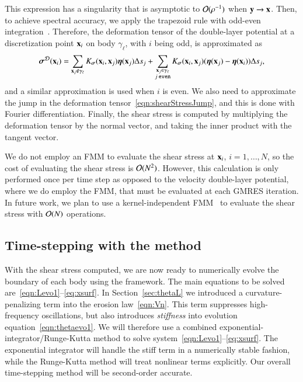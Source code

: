 \documentclass[preprint, 10pt]{elsarticle}
\begin{document}
This expression has a singularity that is asymptotic to
${\mathcal{O}}(\rho^{-1})$ when ${\mathbf{y}} \rightarrow {\mathbf{x}}$.  Then, to achieve
spectral accuracy, we apply the trapezoid rule with odd-even
integration~\cite{sid-isr1988}.  Therefore, the deformation tensor of
the double-layer potential at a discretization point ${\mathbf{x}}_i$ on body
$\gamma_\ell$, with $i$ being odd, is approximated as
\begin{align}
  {\boldsymbol\sigma}^{{\mathcal{D}}}({\mathbf{x}}_i) = \sum_{{\mathbf{x}}_j \notin \gamma_\ell}
    K_{\boldsymbol\sigma}({\mathbf{x}}_i,{\mathbf{x}}_j) {\boldsymbol\eta}({\mathbf{x}}_j) \Delta s_j + 
  \sum_{\substack{{\mathbf{x}}_j \in \gamma_\ell \\ j \: \mathtt{even}}}
    K_{\boldsymbol\sigma}({\mathbf{x}}_i,{\mathbf{x}}_j) ({\boldsymbol\eta}({\mathbf{x}}_j) - {\boldsymbol\eta}({\mathbf{x}}_i)) \Delta s_j,
  \label{eqn:stressOddEven}
\end{align}
and a similar approximation is used when $i$ is even.  We also need to
approximate the jump in the deformation
tensor~\eqref{eqn:shearStressJump}, and this is done with Fourier
differentiation.  Finally, the shear stress is computed by multiplying
the deformation tensor by the normal vector, and taking the inner
product with the tangent vector.

We do not employ an FMM to evaluate the shear stress at ${\mathbf{x}}_i$,
$i=1,\ldots,N$, so the cost of evaluating the shear stress is
${\mathcal{O}}(N^2)$.  However, this calculation is only performed once per time
step as opposed to the velocity double-layer potential, where we do
employ the FMM, that must be evaluated at each GMRES iteration.  In
future work, we plan to use a kernel-independent
FMM~\cite{yin-bir-zor2004} to evaluate the shear stress with ${\mathcal{O}}(N)$
operations.

\subsection{Time-stepping with the {\thL} method} 
\label{sec:timeStepping}

With the shear stress computed, we are now ready to numerically evolve the boundary of each body using the {\thL} framework. The main equations to be solved are~\eqref{eqn:Levo1}--\eqref{eq:xsurf}.  In Section~\ref{sec:thetaL} we introduced a curvature-penalizing term into the erosion law~\eqref{eqn:Vn}. This term suppresses high-frequency oscillations, but also introduces {\em stiffness} into evolution equation~\eqref{eqn:thetaevo1}. We will therefore use a combined exponential-integrator/Runge-Kutta method to solve system~\eqref{eqn:Levo1}--\eqref{eq:xsurf}. The exponential integrator will handle the stiff term in a numerically stable fashion, while the Runge-Kutta method will treat nonlinear terms explicitly. Our overall time-stepping method will be second-order accurate.
\end{document}
